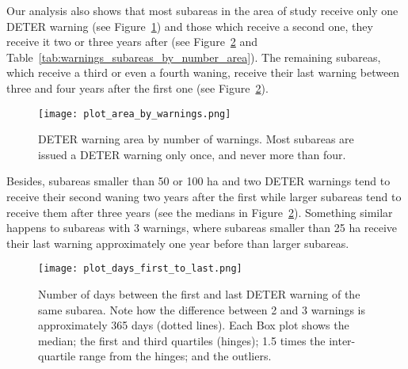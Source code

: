 Our analysis also shows that most subareas in the area of study receive only 
one DETER warning (see Figure~\ref{fig:plot_area_by_warnings}) and those which 
receive a second one, they receive it two or three years after (see 
Figure~\ref{fig:plot_days_first_to_last} and 
Table~\ref{tab:warnings_subareas_by_number_area}). 
The remaining subareas, which receive a third or even a fourth waning, receive 
their last warning between three and four years after the first one (see 
Figure~\ref{fig:plot_days_first_to_last}).

\begin{figure}[h] 
    \begin{center}
    \texttt{[image: plot\_area\_by\_warnings.png]}
    \caption{DETER warning area by number of warnings. Most subareas are issued
        a DETER warning only once, and never more than four.}
    \label{fig:plot_area_by_warnings}
    \end{center}
\end{figure}



Besides, subareas smaller than 50 or 100 ha and two DETER warnings tend to 
receive their second waning two years after the first while larger subareas 
tend to receive them after three years (see the medians in 
Figure~\ref{fig:plot_days_first_to_last}). 
Something similar happens to subareas with 3 warnings, where subareas smaller 
than 25 ha receive their last warning approximately one year before than larger 
subareas.

\begin{figure}[h] 
    \begin{center}
    \texttt{[image: plot\_days\_first\_to\_last.png]}
    \caption{Number of days between the first and last DETER warning of the 
        same subarea. Note how the difference between 2 and 3 warnings is 
        approximately 365 days (dotted lines). Each Box plot shows the median; 
        the first and third quartiles (hinges); 1.5 times the inter-quartile 
        range from the hinges; and the outliers.}
    \label{fig:plot_days_first_to_last}
    \end{center}
\end{figure}

